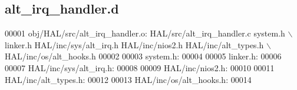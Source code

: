 \subsection{alt\+\_\+irq\+\_\+handler.\+d}
\label{alt__irq__handler_8d_source}

\begin{DoxyCode}
00001 obj/HAL/src/alt_irq_handler.o: HAL/src/alt_irq_handler.c system.h \(\backslash\)
 linker.h HAL/inc/sys/alt_irq.h HAL/inc/nios2.h HAL/inc/alt\_types.h \(\backslash\)
 HAL/inc/os/alt\_hooks.h
00002 
00003 system.h:
00004 
00005 linker.h:
00006 
00007 HAL/inc/sys/alt_irq.h:
00008 
00009 HAL/inc/nios2.h:
00010 
00011 HAL/inc/alt\_types.h:
00012 
00013 HAL/inc/os/alt\_hooks.h:
00014 \end{DoxyCode}
